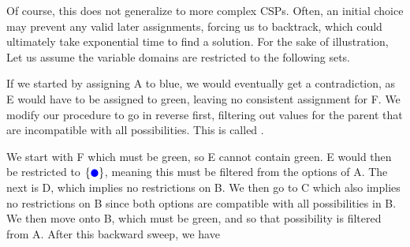 \begin{center}
\end{center}

Of course, this does not generalize to more complex CSPs. Often, an initial choice may prevent any valid later assignments, forcing us to backtrack, which could ultimately take exponential time to find a solution. For the sake of illustration, Let us assume the variable domains are restricted to the following sets.

\begin{center}
\end{center}

If we started by assigning A to blue, we would eventually get a contradiction, as E would have to be assigned to green, leaving no consistent assignment for F. We modify our procedure to go in reverse first, filtering out values for the parent that are incompatible with all possibilities. This is called .

We start with F which must be green, so E cannot contain green. E would then be restricted to $\{{\color{blue}\CIRCLE}\}$, meaning this must be filtered from the options of A. The next is D, which implies no restrictions on B. We then go to C which also implies no restrictions on B since both options are compatible with all possibilities in B. We then move onto B, which must be green, and so that possibility is filtered from A. After this backward sweep, we have

